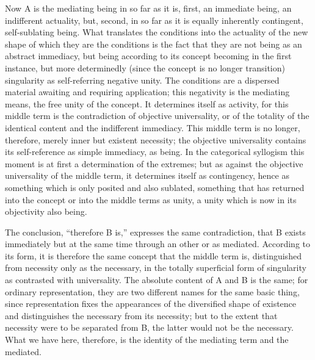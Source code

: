 Now A is the mediating being in so far as it is,
first, an immediate being, an indifferent actuality,
but, second, in so far as it is equally
inherently contingent, self-sublating being.
What translates the conditions into the actuality
of the new shape of which they are the conditions is
the fact that they are not being as an abstract immediacy,
but being according to its concept
becoming in the first instance,
but more determinedly
(since the concept is no longer transition)
singularity as self-referring negative unity.
The conditions are a dispersed material
awaiting and requiring application;
this negativity is the mediating means,
the free unity of the concept.
It determines itself as activity,
for this middle term is
the contradiction of objective universality,
or of the totality of the identical content
and the indifferent immediacy.
This middle term is no longer, therefore,
merely inner but existent necessity;
the objective universality contains its
self-reference as simple immediacy, as being.
In the categorical syllogism this moment is at first
a determination of the extremes;
but as against the objective universality of the middle term,
it determines itself as contingency,
hence as something which is only posited and also sublated,
something that has returned into the concept
or into the middle terms as unity,
a unity which is now in its objectivity also being.

The conclusion, “therefore B is,” expresses the same contradiction,
that B exists immediately but at the same time
through an other or as mediated.
According to its form, it is therefore the same concept
that the middle term is,
distinguished from necessity only as the necessary,
in the totally superficial form of singularity
as contrasted with universality.
The absolute content of A and B is the same;
for ordinary representation,
they are two different names
for the same basic thing,
since representation fixes the appearances
of the diversified shape of existence
and distinguishes the necessary from its necessity;
but to the extent that necessity were to be separated from B,
the latter would not be the necessary.
What we have here, therefore, is
the identity of the mediating term and the mediated.

